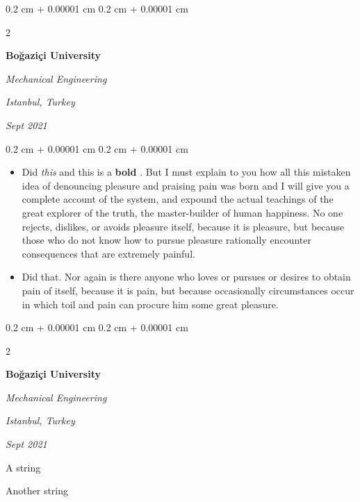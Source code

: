 \documentclass[10pt, letterpaper]{article}
\newenvironment{summary}{
    \begin{description}[
        topsep=0.10 cm,
        parsep=0.10 cm,
        partopsep=0pt,
        itemsep=0pt,
        leftmargin=0.4 cm + 10pt
    ]
}{
    \end{description}
} %
\newenvironment{highlights}{
    \begin{itemize}[
        topsep=0.10 cm,
        parsep=0.10 cm,
        partopsep=0pt,
        itemsep=0pt,
        leftmargin=0.4 cm + 10pt
    ]
}{
    \end{itemize}
} %
\newenvironment{onecolentry}{
    \begin{adjustwidth}{
        0.2 cm + 0.00001 cm
    }{
        0.2 cm + 0.00001 cm
    }
}{
    \end{adjustwidth}
} %
\newenvironment{twocolentry}[2][]{
    \onecolentry
    \def\secondColumn{#2}
    \setcolumnwidth{\fill, 4.5 cm}
    \begin{paracol}{2}
}{
    \switchcolumn \raggedleft \secondColumn
    \end{paracol}
    \endonecolentry
} %
\let\hrefWithoutArrow\href
\renewcommand{\href}[2]{\hrefWithoutArrow{#1}{\ifthenelse{\equal{#2}{}}{ }{#2 }\raisebox{.15ex}{\footnotesize \faExternalLink*}}}
\begin{document}
        \vspace{0.2 cm}

        \begin{twocolentry}{
        \textit{Istanbul, Turkey}    
            
        \textit{Sept 2021}}
            \textbf{Boğaziçi University}

            \textit{Mechanical Engineering}
        \end{twocolentry}
        \vspace{0.10 cm}
        \begin{onecolentry}
            \begin{highlights}
                \item Did \textit{this} and this is a \textbf{bold} \href{https://example.com}{link}. But I must explain to you how all this mistaken idea of denouncing pleasure and praising pain was born and I will give you a complete account of the system, and expound the actual teachings of the great explorer of the truth, the master-builder of human happiness. No one rejects, dislikes, or avoids pleasure itself, because it is pleasure, but because those who do not know how to pursue pleasure rationally encounter consequences that are extremely painful.
                \item Did that. Nor again is there anyone who loves or pursues or desires to obtain pain of itself, because it is pain, but because occasionally circumstances occur in which toil and pain can procure him some great pleasure.
            \end{highlights}
        \end{onecolentry}


        \vspace{0.2 cm}

        \begin{twocolentry}{
        \textit{Istanbul, Turkey}    
            
        \textit{Sept 2021}}
            \textbf{Boğaziçi University}

            \textit{Mechanical Engineering}
        \end{twocolentry}
            \begin{summary}
                \item A string
                \item Another string
            \end{summary}


        \vspace{0.2 cm}
\end{document}
